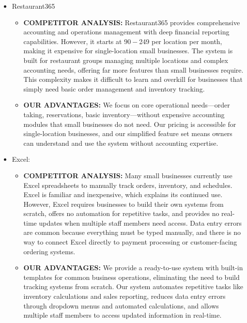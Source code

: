 \documentclass[]{VUMIFTemplateClass}
\begin{document}
\begin{itemize}
    \item Restaurant365
    \begin{itemize}
        \item \textbf{COMPETITOR ANALYSIS:}
        Restaurant365 provides comprehensive
        accounting and operations management with deep financial reporting
        capabilities. However, it starts at $90-$249 per location per month, making
        it expensive for single-location small businesses. The system is built for
        restaurant groups managing multiple locations and complex accounting needs,
        offering far more features than small businesses require. This complexity
        makes it difficult to learn and overkill for businesses that simply need
        basic order management and inventory tracking.

        \item \textbf{OUR ADVANTAGES:} 
        We focus on core operational needs—order taking,
        reservations, basic inventory—without expensive accounting modules that
        small businesses do not need. Our pricing is accessible for single-location
        businesses, and our simplified feature set means owners can understand and
        use the system without accounting expertise.
    \end{itemize}
    

    \item Excel: 
    
    \begin{itemize}
        \item \textbf{COMPETITOR ANALYSIS:}
        Many small businesses currently use Excel spreadsheets
        to manually track orders, inventory, and schedules. Excel is familiar and
        inexpensive, which explains its continued use. However, Excel requires
        businesses to build their own systems from scratch, offers no automation for
        repetitive tasks, and provides no real-time updates when multiple staff
        members need access. Data entry errors are common because everything must be
        typed manually, and there is no way to connect Excel directly to payment
        processing or customer-facing ordering systems.
        
        \item \textbf{OUR ADVANTAGES:} 
        We provide a ready-to-use system with built-in
        templates for common business operations, eliminating the need to build
        tracking systems from scratch. Our system automates repetitive tasks like
        inventory calculations and sales reporting, reduces data entry errors
        through dropdown menus and automated calculations, and allows multiple staff
        members to access updated information in real-time.
        \end{itemize}
        
\end{itemize}
\end{document}
